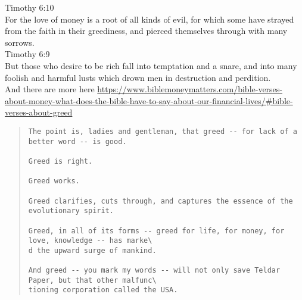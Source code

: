\documentclass[10pt, letterpaper]{article}
\begin{document}
\begin{spacing}{1.8}
Timothy 6:10\\
For the love of money is a root of all kinds of evil, for which some have strayed from the faith in their greediness, and pierced themselves through with many sorrows.\\

Timothy 6:9\\
But those who desire to be rich fall into temptation and a snare, and into many foolish and harmful lusts which drown men in destruction and perdition.\\


And there are more here \url{https://www.biblemoneymatters.com/bible-verses-about-money-what-does-the-bible-have-to-say-about-our-financial-lives/#bible-verses-about-greed}



\begin{quote}
\begin{verbatim}                                                                          
The point is, ladies and gentleman, that greed -- for lack of a better word -- is good.   
                                                                                          
Greed is right.                                                                           
                                                                                          
Greed works.                                                                              
                                                                                          
Greed clarifies, cuts through, and captures the essence of the evolutionary spirit.       
                                                                                          
Greed, in all of its forms -- greed for life, for money, for love, knowledge -- has marke\
d the upward surge of mankind.                                                            
                                                                                          
And greed -- you mark my words -- will not only save Teldar Paper, but that other malfunc\
tioning corporation called the USA.                                                       
\end{verbatim}
\end{quote}



\end{spacing}
\end{document}
